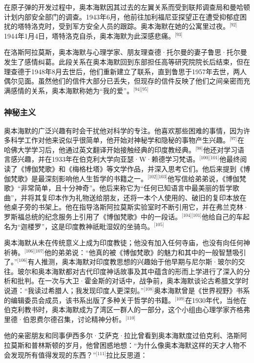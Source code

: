 在原子弹的开发过程中，奥本海默因其过去的左翼关系而受到联邦调查局和曼哈顿计划内部安全部门的调查。1943年6月，他前往加利福尼亚探望正在遭受抑郁症困扰的塔特洛克时，受到军方安全人员的跟踪。奥本海默在她的公寓里过夜。\(^\text{[92]}\)1944年1月4日，塔特洛克自杀，奥本海默为此深感悲痛。\(^\text{[93]}\)

在洛斯阿拉莫斯，奥本海默与心理学家、朋友理查德·托尔曼的妻子鲁思·托尔曼发生了感情纠葛。此段关系在奥本海默回到东部担任高等研究院院长后结束，但在理查德于1948年8月去世后，他们重新建立了联系，直到鲁思于1957年去世，两人偶尔见面。虽然他们的信件大部分已丢失，但现存的信件反映了他们之间亲密而充满感情的关系，奥本海默称她为“我的爱”。\(^\text{[94][95]}\)
\subsubsection{神秘主义}
奥本海默的广泛兴趣有时会干扰他对科学的专注。他喜欢那些困难的事情，因为许多科学工作对他来说似乎很简单，他开始对神秘学和隐秘的事物产生兴趣。\(^\text{[97]}\)在哈佛大学学习后，他通过英文翻译开始接触经典的印度教经典。\(^\text{[98]}\)他还对学习语言感兴趣，并在1933年在伯克利大学向亚瑟·W·赖德学习梵语。\(^\text{[100][101]}\)他最终阅读了《博伽梵歌》和《梅格杜塔》等文学作品，并深入思考它们。他后来提到《博伽梵歌》是最深刻影响他人生哲学的书籍之一。\(^\text{[102][103]}\)他写信给弟弟说，《博伽梵歌》“非常简单，且十分神奇”。他后来称它为“任何已知语言中最美丽的哲学歌曲”，并将其复印本作为礼物送给朋友，还将一本个人使用的、破旧的复印本放在他桌子旁的书架上。他在指导洛斯阿拉莫斯实验室时不断引用它，并在弗兰克林·罗斯福总统的纪念服务上引用了《博伽梵歌》中的一段话。\(^\text{[104][101]}\)他给自己的车起名为“迦楼罗”，这是印度教神祇毗湿奴的坐骑鸟。\(^\text{[105]}\)

奥本海默从未在传统意义上成为印度教徒；他没有加入任何寺庙，也没有向任何神祈祷。\(^\text{[106][107]}\)他的弟弟说：“他真的被《博伽梵歌》的魅力和其中的一般智慧吸引了。”\(^\text{[106]}\)有人推测，奥本海默对印度教思想的兴趣始于他早期与尼尔斯·玻尔的交往。玻尔和奥本海默都对古代印度神话故事及其中蕴含的形而上学进行了深入的分析和批判。在一次与大卫·霍金斯的对话中，战争前，奥本海默谈论古希腊文学时说道：“我读过希腊人；我发现印度人更深刻。”\(^\text{[108]}\)奥本海默曾是《世界视野》书系的编辑委员会成员，该书系出版了多种关于哲学的书籍。\(^\text{[109]}\)在1930年代，当他在伯克利教书时，奥本海默成为了湾区一群人的一部分，这个小组由心理学家齐格弗里德·伯恩费尔德召集，讨论精神分析。\(^\text{[110]}\)

他的亲密朋友和同事伊西多尔·艾萨克·拉比曾看到奥本海默度过伯克利、洛斯阿拉莫斯和普林斯顿的岁月，他曾困惑地想：“为什么像奥本海默这样的天才人物不会发现所有值得发现的东西？”\(^\text{[111]}\)拉比反思道：

